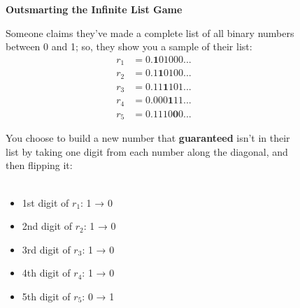 \begin{figure}[H]
\centering
\vspace{1em}
{\LARGE\bfseries Outsmarting the Infinite List Game}

\vspace{2em} %

\noindent
\begin{minipage}[t]{0.45\textwidth}
\begin{tcolorbox}[title=1. The challenge:, left=4mm, borderline west={1pt}{0pt}{black}]
Someone claims they’ve made a complete list of all binary numbers between 0 and 1; so, they show you a sample of their list:
\[
\begin{aligned}
    r_1 &= 0.\mathbf{1}01000... \\
    r_2 &= 0.1\mathbf{1}0100... \\
    r_3 &= 0.11\mathbf{1}101... \\
    r_4 &= 0.000\mathbf{1}11... \\
    r_5 &= 0.1110\mathbf{0}0...
\end{aligned}
\]
\end{tcolorbox}
\end{minipage}
\hspace{0.05\textwidth}
\begin{minipage}[t]{0.45\textwidth}
\begin{tcolorbox}[title=2. Your strategy:, left=4mm, borderline west={1pt}{0pt}{black}]
You choose to build a new number that \textbf{guaranteed} isn’t in their list by taking one digit from each number along the diagonal, and then flipping it:
\\
\\
\begin{itemize}
  \item 1st digit of \( r_1 \): 1 → 0
  \item 2nd digit of \( r_2 \): 1 → 0
  \item 3rd digit of \( r_3 \): 1 → 0
  \item 4th digit of \( r_4 \): 1 → 0
  \item 5th digit of \( r_5 \): 0 → 1
\end{itemize}
\end{tcolorbox}
\end{minipage}

\vspace{2em}


\end{figure}
